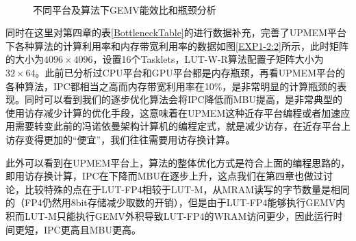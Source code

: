 \begin{figure}[htbp!]
	\centering
	\\
	\label{EXP1-2}
	\caption{不同平台及算法下GEMV能效比和瓶颈分析}
\end{figure}

同时在这里对第四章的表\ref{BottleneckTable}的进行数据补充，完善了UPMEM平台下各种算法的计算利用率和内存带宽利用率的数据如图\ref{EXP1-2:2}所示，此时矩阵的大小为$4096\times 4096$，设置16个Tasklets，LUT-W-R算法配置子矩阵大小为$32\times 64$。此前已分析过CPU平台和GPU平台都是内存瓶颈，再看UPMEM平台的各种算法，IPC都相当之高而内存带宽利用率在10\%，是非常明显的计算瓶颈的表现。同时可以看到我们的逐步优化算法会将IPC降低而MBU提高，是非常典型的使用访存减少计算的优化手段，这意味着在UPMEM这种近存平台编程或者加速应用需要转变此前的冯诺依曼架构计算机的编程定式，就是减少访存，在近存平台上访存变得更加的“便宜”，我们往往需要用访存换计算。

此外可以看到在UPMEM平台上，算法的整体优化方式是符合上面的编程思路的，即用访存换计算，IPC在下降而MBU在逐步上升，这点我们在第四章也做过讨论，比较特殊的点在于LUT-FP4相较于LUT-M，从MRAM读写的字节数量是相同的（FP4仍然用8bit存储减少取数的开销），但是由于LUT-FP4能够执行GEMV内积而LUT-M只能执行GEMV外积导致LUT-FP4的WRAM访问更少，因此运行时间更短，IPC更高且MBU更高。

